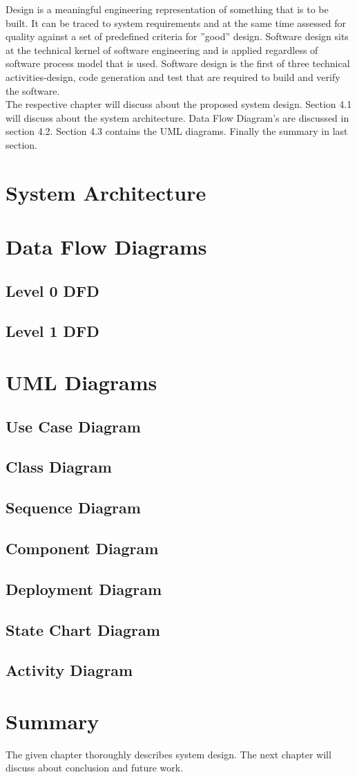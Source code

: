 Design is a meaningful engineering representation of something that is to be built. It can be traced to system requirements and at the same time assessed for quality against a set of predefined criteria for ”good” design. Software design sits at the technical kernel of software
engineering and is applied regardless of software process model that is used. Software design is the first of three technical activities-design, code generation and test that are required to build and verify the software.\\
The respective chapter will discuss about the proposed system design. Section 4.1 will discuss about the system architecture. Data Flow Diagram’s are discussed in section 4.2. Section 4.3 contains the UML diagrams. Finally the summary in last section.

\section{System Architecture}
\section{Data Flow Diagrams}
    \subsection{Level 0 DFD}
    \subsection{Level 1 DFD}
\section{UML Diagrams}
    \subsection{Use Case Diagram}
    \subsection{Class Diagram}
    \subsection{Sequence Diagram}
    \subsection{Component Diagram}
    \subsection{Deployment Diagram}
    \subsection{State Chart Diagram}
    \subsection{Activity Diagram}

\section{Summary}
The given chapter thoroughly describes system design. The next chapter will discuss about conclusion and future work.
